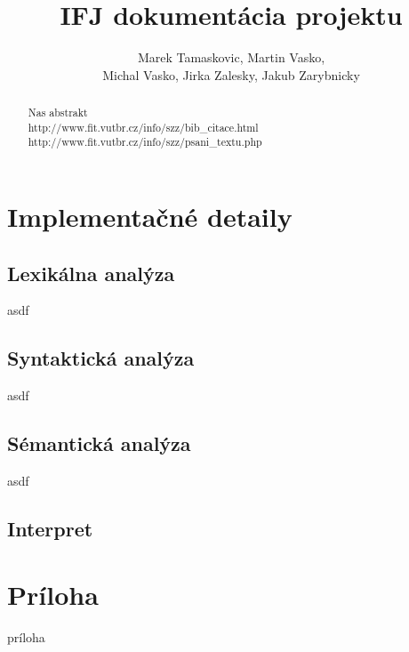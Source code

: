 \documentclass[12pt,a4paper]{report}
\begin{document}
\author{Marek Tamaskovic, Martin Vasko,\\Michal Vasko, Jirka Zalesky, Jakub Zarybnicky}
\title{IFJ dokumentácia projektu}
\maketitle

\begin{abstract}
Nas abstrakt\\
http://www.fit.vutbr.cz/info/szz/bib\_citace.html\\
http://www.fit.vutbr.cz/info/szz/psani\_textu.php
\end{abstract}

\tableofcontents

\chapter{Implementačné detaily}

\section{Lexikálna analýza}
asdf
\section{Syntaktická analýza}
asdf
\section{Sémantická analýza}
asdf
\section{Interpret}

\chapter{Príloha}

príloha
\end{document}
